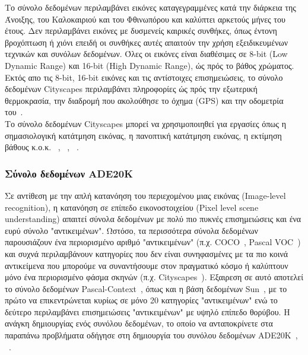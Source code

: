 \documentclass[12pt]{article}
\numberwithin{equation}{section}
\begin{document}
Το σύνολο δεδομένων περιλαμβάνει εικόνες καταγεγραμμένες κατά την διάρκεια της Άνοιξης, του Καλοκαιριού και του Φθινωπόρου και καλύπτει αρκετούς μήνες του έτους. Δεν περιλαμβάνει εικόνες με δυσμενείς καιρικές συνθήκες, όπως έντονη βροχόπτωση ή χιόνι επειδή οι συνθήκες αυτές απαιτούν την χρήση εξειδικευμένων τεχνικών και συνόλων δεδομένων. Όλες οι εικόνες είναι διαθέσιμες σε 8-bit (Low Dynamic Range) και 16-bit (High Dynamic Range), ώς πρός το βάθος χρώματος. Εκτός απο τις 8-bit, 16-bit εικόνες και τις αντίστοιχες επισημειώσεις, το σύνολο δεδομένων Cityscapes περιλαμβάνει πληροφορίες ώς πρός την εξωτερική θερμοκρασία, την διαδρομή που ακολούθησε το όχημα (GPS) και την οδομετρία του~\cite{DBLP:journals/corr/CordtsORREBFRS16}. \\

Το σύνολο δεδομένων Cityscapes μπορεί να χρησιμοποιηθεί για εργασίες όπως η σημασιολογική κατάτμηση εικόνας, η πανοπτική κατάτμηση εικόνας, η εκτίμηση βάθους κ.ο.κ. ~\cite{DBLP:journals/corr/CordtsORREBFRS16}, ~\cite{cheng2022maskedattentionmasktransformeruniversal}, ~\cite{taghavi2024swinmtlsharedarchitecturesimultaneous}.




\subsubsection{Σύνολο δεδομένων ADE20K}

Σε αντίθεση με την απλή κατανόηση του περιεχομένου μιας εικόνας (Image-level recognition), η κατανόηση σε επίπεδο εικονοστοιχείου (Pixel level scene understanding) απαιτεί σύνολα δεδομένων με πολύ πιο πυκνές επισημειώσεις και ένα ευρύ σύνολο "αντικειμένων". Ωστόσο, τα περισσότερα σύνολα δεδομένων παρουσιάζουν ένα περιορισμένο αριθμό "αντικειμένων" (π.χ. COCO~\cite{lin2015microsoftcococommonobjects}, Pascal VOC~\cite{Everingham2010}) και συχνά περιλαμβάνουν κατηγορίες που δεν είναι συνηφασμένες με τα πιο κοινά αντικείμενα που μπορούμε να συναντήσουμε στον πραγματικό κόσμο ή καλύπτουν μόνο ένα περιορισμένο φάσμα σκηνών (π.χ. Cityscapes~\cite{DBLP:journals/corr/CordtsORREBFRS16}). Εξαιρεση σε αυτό αποτελεί το σύνολο δεδομένων Pascal-Context~\cite{6909514}, όπως και η βάση δεδομένων Sun~\cite{5539970}, με το πρώτο να επικεντρώνεται κυρίως σε μόνο 20 κατηγορίες "αντικειμένων" ενώ το δεύτερο περιλαμβάνει επισημειώσεις "αντικειμένων" με υψηλό επίπεδο θορύβου. Η ανάγκη δημιουργίας ενός συνόλου δεδομένων, το οποίο να ανταποκρίνετε στα παραπάνω προβλήματα οδήγησε στη δημιουργία του συνόλου δεδομένων ADE20K~\cite{8100027}, ~\cite{zhou2018semanticunderstandingscenesade20k}. \\
\end{document}
